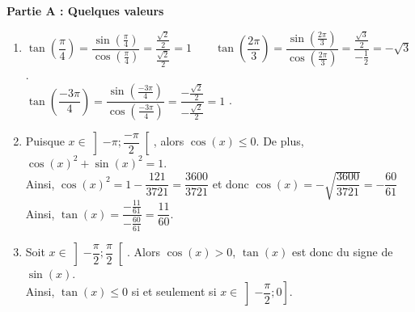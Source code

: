 \documentclass[11pt,fleqn, openany]{book} %
\begin{document}
\begin{solution}
\textbf{Partie A : Quelques valeurs}
\begin{enumerate}
\item $\tan \left( \dfrac{\pi}{4} \right) = \dfrac{\sin\left(\frac{\pi}{4}\right)}{\cos\left(\frac{\pi}{4}\right)}=\dfrac{\frac{\sqrt{2}}{2}}{\frac{\sqrt{2}}{2}}=1 \qquad \tan \left( \dfrac{2\pi}{3} \right)=\dfrac{\sin\left(\frac{2\pi}{3}\right)}{\cos\left(\frac{2\pi}{3}\right)}=\dfrac{\frac{\sqrt{3}}{2}}{-\frac{1}{2}}=-\sqrt{3}$. \\ $\tan \left( \dfrac{-3\pi}{4} \right)=\dfrac{\sin\left(\frac{-3\pi}{4}\right)}{\cos\left(\frac{-3\pi}{4}\right)}=\dfrac{-\frac{\sqrt{2}}{2}}{-\frac{\sqrt{2}}{2}}=1$ .
\vskip5pt
\item Puisque $x \in \left] -\pi ; \dfrac{-\pi}{2} \right[$, alors $\cos(x)\leqslant 0$. De plus, $\cos(x)^2+\sin(x)^2=1$. \\ Ainsi, $\cos(x)^2=1-\dfrac{121}{3721}=\dfrac{3600}{3721}$ et donc $\cos(x)=-\sqrt{\dfrac{3600}{3721}}=-\dfrac{60}{61}$ Ainsi, $\tan(x)=\dfrac{-\frac{11}{61}}{-\frac{60}{61}}=\dfrac{11}{60}$.
\vskip5pt
\item Soit $x \in \left]-\dfrac{\pi}{2};\dfrac{\pi}{2}\right[$. Alors $\cos(x)>0$, $\tan(x)$ est donc du signe de $\sin(x)$.\\ Ainsi, $\tan(x)\leqslant 0$ si et seulement si $x\in \left]-\dfrac{\pi}{2};0\right]$.
\end{enumerate}


\end{solution}
\end{document}
